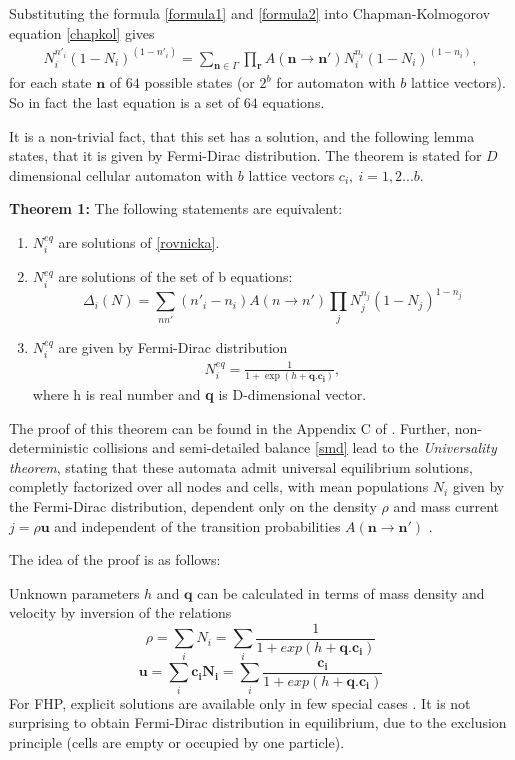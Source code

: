 Substituting the formula \ref{formula1} and \ref{formula2} into Chapman-Kolmogorov equation \ref{chapkol} gives
\begin{align} \label{rovnicka}
N_i^{n'_i} (1 - N_i)^{(1-n'_i)} = \sum_{\bm{n} \in \Gamma} \prod_{\bm{r}} A(\bm{n} \rightarrow \bm{n'}) N_i^{n_i} (1 - N_i)^{(1-n_i)},
\end{align}
for each state $\bm{n}$ of $64$ possible states (or $2^b$ for automaton with $b$ lattice vectors). So in fact the last equation is a set of $64$ equations.

It is a non-trivial fact, that this set has a solution, and the following lemma states, that it is given by Fermi-Dirac distribution. The theorem is stated for $D$ dimensional cellular automaton with $b$ lattice vectors $c_i,~i=1,2...b$.

\textbf{Theorem 1:}
The following statements are equivalent:
\begin{enumerate}
\item $N_i^{eq}$ are solutions of \ref{rovnicka}.\\
\item $N_i^{eq}$ are solutions of the set of b equations:
\begin{equation}
\Delta_i(N) = \sum_{nn'}(n'_i - n_i)A(n \rightarrow n')\prod_j N_j^{n_j}(1-N_j)^{1-n_j}
\end{equation} 

\item $N_i^{eq}$ are given by Fermi-Dirac distribution
\begin{align} \label{fd}
N_i^{eq} = \frac{1}{1 + \exp(h + \bm{q}.\bm{c_i})},
\end{align}
where h is real number and \textbf{q} is D-dimensional vector.
\end{enumerate}

The proof of this theorem can be found in the Appendix C of \cite{frisch}.
Further, non-deterministic collisions and semi-detailed balance \ref{smd} lead to the \textit{Universality theorem}, stating that these automata admit universal equilibrium solutions, completly factorized over all nodes and cells, with mean populations $N_i$ given by the Fermi-Dirac distribution, dependent only on the density $\rho$ and mass current $j = \rho \bm{u}$ and independent of the transition probabilities $A(\bm{n} \rightarrow \bm{n'})$ \cite{frisch}.

The idea of the proof is as follows:

Unknown parameters $h$ and $\bm{q}$ can be calculated in terms of mass density and velocity by inversion of the relations
\begin{equation}
\rho = \sum_i N_i = \sum_i \frac{1}{1+ exp(h + \bm{q}.\bm{c_i})}
\end{equation}
\begin{equation}
\bm{u} = \sum_i \bm{c_i} \bm{N_i} = \sum_i \frac{\bm{c_i}}{1+ exp(h + \bm{q}.\bm{c_i})}
\end{equation}
For FHP, explicit solutions are available only in few special cases \cite{frisch}.
It is not surprising to obtain Fermi-Dirac distribution in equilibrium, due to the exclusion principle (cells are empty or occupied by one particle).

